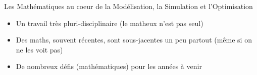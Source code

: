 \documentclass[slideopt,A4]{beamer}
\begin{document}
\begin{frame}{Les Mathématiques au coeur de la Modélisation, la Simulation et l'Optimisation}
  
\begin{itemize}
\item Un travail très pluri-disciplinaire  (le matheux n'est pas seul)
\item Des maths, souvent récentes, sont sous-jacentes un peu partout (même si on ne les voit pas)
\item De nombreux défis (mathématiques) pour les années à venir %
\end{itemize}


\end{frame}
\end{document}
